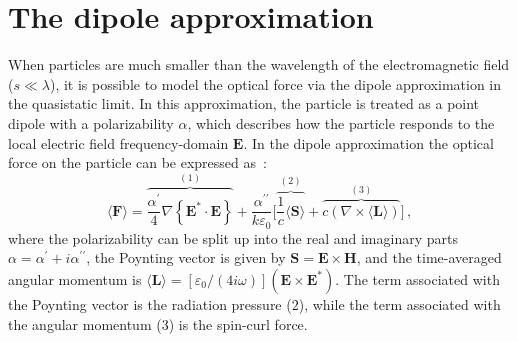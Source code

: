 \section{The dipole approximation~\cite{ownpub1, ownpub3}}

When particles are much smaller than the wavelength of the electromagnetic field ($s\ll \lambda$), it is possible to model the optical force via the dipole approximation in the
quasistatic limit. In this approximation, the particle is treated as a point dipole with a polarizability $\alpha$, which describes how the particle responds to the local electric field frequency-domain $\mathbf{E}$.
In the dipole approximation the optical force on the particle can be expressed as~\cite{novotny}:
\begin{equation}
    \langle\mathbf{F}\rangle=\overbrace{\frac{\alpha^{\prime}}{4} \nabla\left\{\mathbf{E}^* \cdot \mathbf{E}\right\}}^{(1)}
    +\frac{\alpha^{\prime \prime}}{k \varepsilon_0} \Big[\overbrace{\frac{1}{c}\langle \mathbf{S} \rangle}^{(2)} + \overbrace{c \left( \nabla \times \langle \mathbf{L} \rangle \right)}^{(3)}\Big]\,,
\end{equation}
where the polarizability can be split up into the real and imaginary parts 
$\alpha=\alpha^\prime + i \alpha^{\prime \prime}$, the Poynting vector is given by $\mathbf{S} = \mathbf{E} \times \mathbf{H}$, and the time-averaged angular momentum is 
$\langle \mathbf{L} \rangle = [\varepsilon_0/(4 i \omega)](\mathbf{E} \times \mathbf{E}^*)$. 
The term associated with the Poynting vector is the radiation pressure ($2$), while the term associated 
with the angular momentum ($3$) is the spin-curl force.


